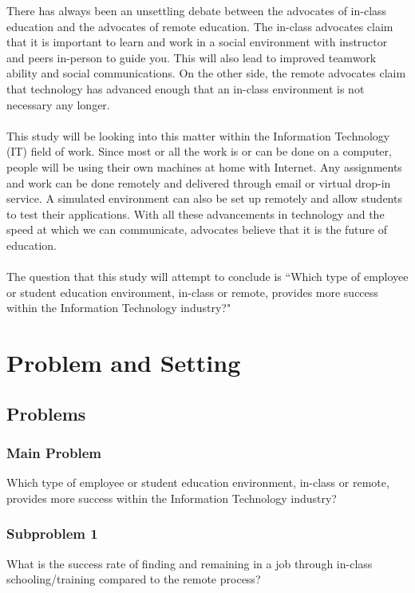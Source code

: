 \documentclass[titlepage]{article}
\begin{document}
There has always been an unsettling debate between the advocates of in-class education
and the advocates of remote education.  The in-class advocates claim that it is important
to learn and work in a social environment with instructor and peers in-person to guide
you.  This will also lead to improved teamwork ability and social communications.  On
the other side, the remote advocates claim that technology has advanced enough that an
in-class environment is not necessary any longer.  \\\\
This study will be looking into this matter within the Information Technology (IT) field
of work.  Since most or all the work is or can be done on a computer, people will be using
their own machines at home with Internet.  Any assignments and work can be done remotely
and delivered through email or virtual drop-in service.  A simulated environment can also be
set up remotely and allow students to test their applications.  With all these advancements
in technology and the speed at which we can communicate, advocates believe that it is the
future of education. \\\\
The question that this study will attempt to conclude is ``Which type of employee or student
education environment, in-class or remote, provides more success within the Information 
Technology industry?"  

\clearpage

\section{Problem and Setting}

\subsection{Problems}

\subsubsection{Main Problem}
Which type of employee or student education environment, in-class or remote, provides
more success within the Information Technology industry?

\subsubsection{Subproblem 1}
What is the success rate of finding and remaining in a job through in-class
schooling/training compared to the remote process?
\end{document}
